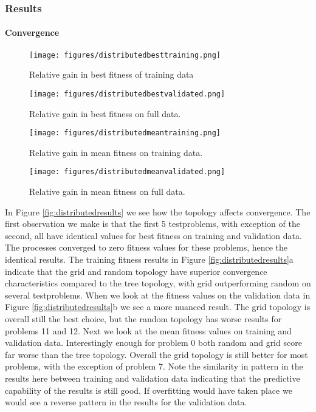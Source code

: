 \subsubsection{Results}
\paragraph{Convergence}
\begin{figure*}
    \centering
    \begin{subfigure}{0.6\textwidth}
    \centering
        \texttt{[image: figures/distributedbesttraining.png]}
        \caption{Relative gain in best fitness of training data}
    \end{subfigure}%
    \begin{subfigure}{0.6\textwidth}
    \centering
        \texttt{[image: figures/distributedbestvalidated.png]}
        \caption{Relative gain in best fitness on full data.}
    \end{subfigure}
        \begin{subfigure}{0.6\textwidth}
    \centering
        \texttt{[image: figures/distributedmeantraining.png]}
        \caption{Relative gain in mean fitness on training data.}
    \end{subfigure}%
    \begin{subfigure}{0.6\textwidth}
    \centering
        \texttt{[image: figures/distributedmeanvalidated.png]}
        \caption{Relative gain in mean fitness on full data.}
    \end{subfigure}
    \caption{Convergence differences between topologies.}
    \label{fig:distributedresults}
    \end{figure*}
In Figure \ref{fig:distributedresults} we see how the topology affects convergence. The first observation we make is that the first 5 testproblems, with exception of the second, all have identical values for best fitness on training and validation data. The processes converged to zero fitness values for these problems, hence the identical results. 
The training fitness results in Figure \ref{fig:distributedresults}a indicate that the grid and random topology have superior convergence characteristics compared to the tree topology, with grid outperforming random on several testproblems. When we look at the fitness values on the validation data in Figure \ref{fig:distributedresults}b we see a more nuanced result. The grid topology is overall still the best choice, but the random topology has worse results for problems 11 and 12.
Next we look at the mean fitness values on training and validation data. Interestingly enough for problem 0 both random and grid score far worse than the tree topology. Overall the grid topology is still better for most problems, with the exception of problem 7. Note the similarity in pattern in the results here between training and validation data indicating that the predictive capability of the results is still good. If overfitting would have taken place we would see a reverse pattern in the results for the validation data.



